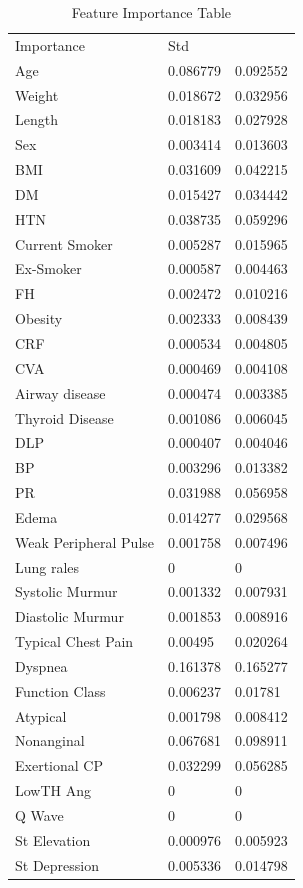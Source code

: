 \begin{table}
\centering
\caption{Feature Importance Table}\label{Importance}
\begin{tabular}{lll}
Importance            & Std      &          \\
Age                   & 0.086779 & 0.092552 \\
Weight                & 0.018672 & 0.032956 \\
Length                & 0.018183 & 0.027928 \\
Sex                   & 0.003414 & 0.013603 \\
BMI                   & 0.031609 & 0.042215 \\
DM                    & 0.015427 & 0.034442 \\
HTN                   & 0.038735 & 0.059296 \\
Current Smoker        & 0.005287 & 0.015965 \\
Ex-Smoker             & 0.000587 & 0.004463 \\
FH                    & 0.002472 & 0.010216 \\
Obesity               & 0.002333 & 0.008439 \\
CRF                   & 0.000534 & 0.004805 \\
CVA                   & 0.000469 & 0.004108 \\
Airway disease        & 0.000474 & 0.003385 \\
Thyroid Disease       & 0.001086 & 0.006045 \\
DLP                   & 0.000407 & 0.004046 \\
BP                    & 0.003296 & 0.013382 \\
PR                    & 0.031988 & 0.056958 \\
Edema                 & 0.014277 & 0.029568 \\
Weak Peripheral Pulse & 0.001758 & 0.007496 \\
Lung rales            & 0        & 0        \\
Systolic Murmur       & 0.001332 & 0.007931 \\
Diastolic Murmur      & 0.001853 & 0.008916 \\
Typical Chest Pain    & 0.00495  & 0.020264 \\
Dyspnea               & 0.161378 & 0.165277 \\
Function Class        & 0.006237 & 0.01781  \\
Atypical              & 0.001798 & 0.008412 \\
Nonanginal            & 0.067681 & 0.098911 \\
Exertional CP         & 0.032299 & 0.056285 \\
LowTH Ang             & 0        & 0        \\
Q Wave                & 0        & 0        \\
St Elevation          & 0.000976 & 0.005923 \\
St Depression         & 0.005336 & 0.014798
\end{tabular}
\end{table}

